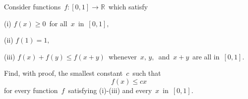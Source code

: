Consider functions $\, f: [0,1] \rightarrow \mathbb{R} \,$ which satisfy

(i) $f(x) \geq 0 \,$ for all $\, x \,$ in $\, [0,1],$

(ii) $f(1) = 1,$

(iii) $f(x) + f(y) \leq f(x+y)\,$ whenever $\, x, \, y, \,$ and $\, x + y \,$ are all in $\, [0,1]$.

Find, with proof, the smallest constant $\, c \,$ such that\[ f(x) \leq cx  \]for every function $\, f \,$ satisfying (i)-(iii) and every $\, x \,$ in $\, [0,1]$.